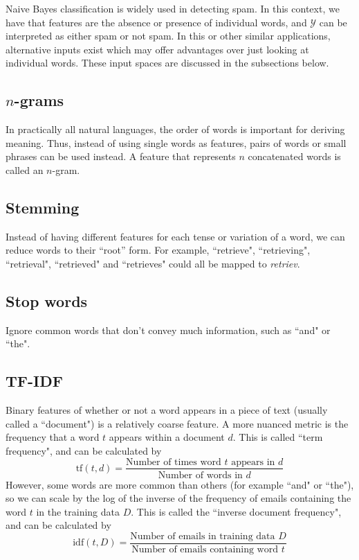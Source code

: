\documentclass[12pt]{article}
\begin{document}
Naive Bayes classification is widely used in detecting spam. In this context, we have that features are the absence or presence of individual words, and $\mathcal{Y}$ can be interpreted as either spam or not spam. In this or other similar applications, alternative inputs exist which may offer advantages over just looking at individual words. These input spaces are discussed in the subsections below.

\subsection{$n$-grams}

In practically all natural languages, the order of words is important for deriving meaning. Thus, instead of using single words as features, pairs of words or small phrases can be used instead. A feature that represents $n$ concatenated words is called an $n$-gram.

\subsection{Stemming}

Instead of having different features for each tense or variation of a word, we can reduce
words to their “root” form. For example, ``retrieve", ``retrieving", ``retrieval", ``retrieved" and ``retrieves" could all be mapped to \textit{retriev}.

\subsection{Stop words}

Ignore common words that don't convey much information, such as ``and" or ``the".

\subsection{TF-IDF}

Binary features of whether or not a word appears in a piece of text (usually called a ``document") is a relatively coarse feature. A more nuanced metric is the frequency that a word $t$ appears within a document $d$. This is called ``term frequency", and can be calculated by
\[ \text{tf}(t, d) = \frac{\text{Number of times word } t \text{ appears in } d}{\text{Number of words in } d}\]
However, some words are more common than others (for example ``and" or ``the"), so we can scale by the log of the inverse of the frequency of emails containing the word $t$ in the training data $D$. This is called the ``inverse document frequency", and can be calculated by
\[ \text{idf}(t, D) = \frac{\text{Number of emails in training data } D}{\text{Number of emails containing word } t} \]
\end{document}
